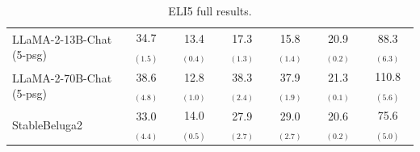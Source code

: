 \begin{table}[h]
\begin{tabular}{lcccccc}
            LLaMA-2-13B-Chat \vani{} (5-psg) & 34.7 $_{(1.5)}$&13.4 $_{(0.4)}$&17.3 $_{(1.3)}$&15.8 $_{(1.4)}$&20.9 $_{(0.2)}$&88.3 $_{(6.3)}$\\
            LLaMA-2-70B-Chat \vani{} (5-psg)  & 38.6 $_{(4.8)}$&12.8 $_{(1.0)}$&38.3 $_{(2.4)}$&37.9 $_{(1.9)}$&21.3 $_{(0.1)}$&110.8 $_{(5.6)}$\\
            \midrule
            StableBeluga2 & 33.0 $_{(4.4)}$&14.0 $_{(0.5)}$&27.9 $_{(2.7)}$&29.0 $_{(2.7)}$&20.6 $_{(0.2)}$&75.6 $_{(5.0)}$\\
            \bottomrule
        \end{tabular}
    \caption{
        ELI5 full results.
    }
    \label{tab:eli5_full}
\end{table}

